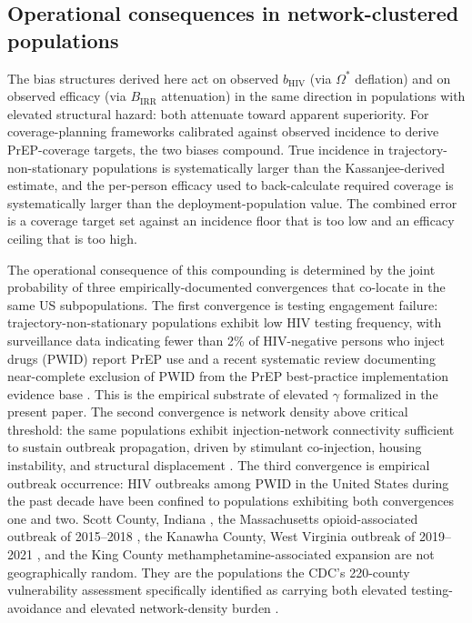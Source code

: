 \documentclass[12pt]{article}
\begin{document}
\subsection{Operational consequences in network-clustered populations}

The bias structures derived here act on observed $b_{\mathrm{HIV}}$ (via $\Omega^*$ deflation) and on observed efficacy (via $B_{\mathrm{IRR}}$ attenuation) in the same direction in populations with elevated structural hazard: both attenuate toward apparent superiority. For coverage-planning frameworks calibrated against observed incidence to derive PrEP-coverage targets, the two biases compound. True incidence in trajectory-non-stationary populations is systematically larger than the Kassanjee-derived estimate, and the per-person efficacy used to back-calculate required coverage is systematically larger than the deployment-population value. The combined error is a coverage target set against an incidence floor that is too low and an efficacy ceiling that is too high.

The operational consequence of this compounding is determined by the joint probability of three empirically-documented convergences that co-locate in the same US subpopulations. The first convergence is testing engagement failure: trajectory-non-stationary populations exhibit low HIV testing frequency, with surveillance data indicating fewer than 2\% of HIV-negative persons who inject drugs (PWID) report PrEP use \cite{baugher2025} and a recent systematic review documenting near-complete exclusion of PWID from the PrEP best-practice implementation evidence base \cite{kamitani2024}. This is the empirical substrate of elevated $\gamma$ formalized in the present paper. The second convergence is network density above critical threshold: the same populations exhibit injection-network connectivity sufficient to sustain outbreak propagation, driven by stimulant co-injection, housing instability, and structural displacement \cite{strathdee2020,desjarlais2022}. The third convergence is empirical outbreak occurrence: HIV outbreaks among PWID in the United States during the past decade have been confined to populations exhibiting both convergences one and two. Scott County, Indiana \cite{peters2016,gonsalves2018}, the Massachusetts opioid-associated outbreak of 2015--2018 \cite{alpren2020}, the Kanawha County, West Virginia outbreak of 2019--2021 \cite{bonacci2023,hershow2024}, and the King County methamphetamine-associated expansion \cite{glick2018} are not geographically random. They are the populations the CDC's 220-county vulnerability assessment specifically identified as carrying both elevated testing-avoidance and elevated network-density burden \cite{cdc220counties}.
\end{document}
